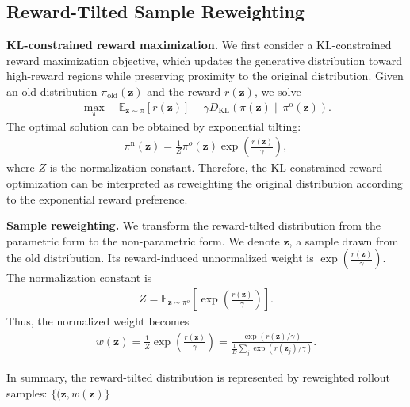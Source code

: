 \documentclass{article} %
\begin{document}
\subsection{Reward-Tilted Sample Reweighting}
\noindent\textbf{KL-constrained reward maximization.}
We first consider a KL-constrained reward maximization objective, which
updates the generative distribution toward high-reward regions while
preserving proximity to the original distribution. Given an old distribution
$\pi_{\mathrm{old}}(\mathbf{z})$
and the reward $r(\mathbf{z})$, we solve
\begin{align}
\max_{\pi}
\quad
\mathbb{E}_{\mathbf{z}\sim\pi}
[r(\mathbf{z})]
-
\gamma
D_{\mathrm{KL}}
(\pi(\mathbf{z})\|
\pi^{\mathrm{o}}(\mathbf{z})).
\end{align}
The optimal solution can be obtained by exponential tilting:
\begin{align}
\pi^{\mathrm{n}}(\mathbf{z})
=
\frac{1}{Z}
\pi^o(\mathbf{z})
\exp
\left(
\frac{r(\mathbf{z})}{\gamma}
\right),\label{eqn:exponentialtilting}
\end{align}
where $Z$ is the normalization constant. Therefore, the KL-constrained reward optimization
can be interpreted as reweighting the original distribution according to the
exponential reward preference.

\noindent\textbf{Sample reweighting.}
We transform the 
reward-tilted distribution
from the parametric form
to the non-parametric form.
We denote $\mathbf{z}$,
a sample drawn from
the old distribution.
Its reward-induced unnormalized weight is
$\exp
\left(
\frac{r(\mathbf z)}{\gamma}
\right)$.
The normalization constant is 
\begin{align}
Z = \mathbb{E}_{\mathbf{z} \sim \pi^o}\left[\exp
\left(
\frac{r(\mathbf z)}{\gamma}
\right)\right].
\end{align}
Thus,
the normalized weight becomes
\begin{align}
w(\mathbf z) =
\frac{1}{Z}
\exp
\left(
\frac{r(\mathbf z)}{\gamma}
\right)
=
\frac{
\exp(r(\mathbf z)/\gamma)
}
{
\frac{1}{D}
\sum_j
\exp(r(\mathbf z_j)/\gamma)
}.    
\end{align}

In summary,
the reward-tilted distribution 
is represented
by reweighted rollout samples:
$\{(\mathbf{z}, w(\mathbf{z})\}$
\end{document}
